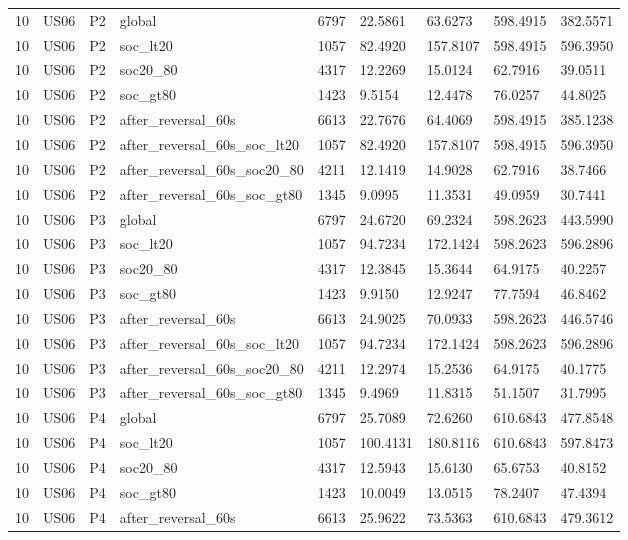 \begin{tabular}{lllllllll}
10 & US06 & P2 & global & 6797 & 22.5861 & 63.6273 & 598.4915 & 382.5571 \\
10 & US06 & P2 & soc\_lt20 & 1057 & 82.4920 & 157.8107 & 598.4915 & 596.3950 \\
10 & US06 & P2 & soc20\_80 & 4317 & 12.2269 & 15.0124 & 62.7916 & 39.0511 \\
10 & US06 & P2 & soc\_gt80 & 1423 & 9.5154 & 12.4478 & 76.0257 & 44.8025 \\
10 & US06 & P2 & after\_reversal\_60s & 6613 & 22.7676 & 64.4069 & 598.4915 & 385.1238 \\
10 & US06 & P2 & after\_reversal\_60s\_soc\_lt20 & 1057 & 82.4920 & 157.8107 & 598.4915 & 596.3950 \\
10 & US06 & P2 & after\_reversal\_60s\_soc20\_80 & 4211 & 12.1419 & 14.9028 & 62.7916 & 38.7466 \\
10 & US06 & P2 & after\_reversal\_60s\_soc\_gt80 & 1345 & 9.0995 & 11.3531 & 49.0959 & 30.7441 \\
10 & US06 & P3 & global & 6797 & 24.6720 & 69.2324 & 598.2623 & 443.5990 \\
10 & US06 & P3 & soc\_lt20 & 1057 & 94.7234 & 172.1424 & 598.2623 & 596.2896 \\
10 & US06 & P3 & soc20\_80 & 4317 & 12.3845 & 15.3644 & 64.9175 & 40.2257 \\
10 & US06 & P3 & soc\_gt80 & 1423 & 9.9150 & 12.9247 & 77.7594 & 46.8462 \\
10 & US06 & P3 & after\_reversal\_60s & 6613 & 24.9025 & 70.0933 & 598.2623 & 446.5746 \\
10 & US06 & P3 & after\_reversal\_60s\_soc\_lt20 & 1057 & 94.7234 & 172.1424 & 598.2623 & 596.2896 \\
10 & US06 & P3 & after\_reversal\_60s\_soc20\_80 & 4211 & 12.2974 & 15.2536 & 64.9175 & 40.1775 \\
10 & US06 & P3 & after\_reversal\_60s\_soc\_gt80 & 1345 & 9.4969 & 11.8315 & 51.1507 & 31.7995 \\
10 & US06 & P4 & global & 6797 & 25.7089 & 72.6260 & 610.6843 & 477.8548 \\
10 & US06 & P4 & soc\_lt20 & 1057 & 100.4131 & 180.8116 & 610.6843 & 597.8473 \\
10 & US06 & P4 & soc20\_80 & 4317 & 12.5943 & 15.6130 & 65.6753 & 40.8152 \\
10 & US06 & P4 & soc\_gt80 & 1423 & 10.0049 & 13.0515 & 78.2407 & 47.4394 \\
10 & US06 & P4 & after\_reversal\_60s & 6613 & 25.9622 & 73.5363 & 610.6843 & 479.3612 \\

\end{tabular}

